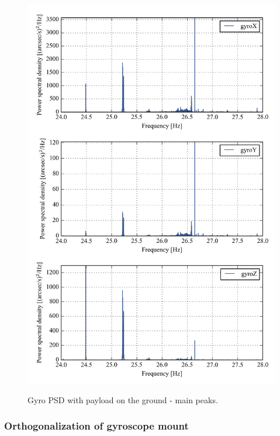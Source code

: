 \begin{figure}[!h]
\begin{center}
\includegraphics{Figures/multiPSD_no_loglog_zoom_400.png}
\label{fig:multiPSD400_no_loglog_zoom_400}
\vspace{-0.5cm}
\caption[Gyro PSD with payload on the ground - Main peaks]{Gyro PSD with payload on the ground - main peaks.}
\end{center}
\end{figure}



\subsubsection{Orthogonalization of gyroscope mount}
\label{ap:gyroOrth}

